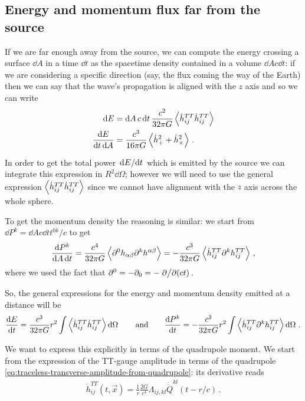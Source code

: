 \documentclass[main.tex]{subfiles}
\begin{document}
\subsection{Energy and momentum flux far from the source}

If we are far enough away from the source, we can compute the energy crossing a surface \(\dd{A}\) in a time \(\dd{t}\) as the spacetime density contained in a volume \(\dd{A} c \dd{t}\): if we are considering a specific direction (say, the flux coming the way of the Earth) then we can say that the wave's propagation is aligned with the \(z\) axis and so we can write 
%
\begin{align}
\dd{E} &= \dd{A} c \dd{t} \frac{c^2}{32 \pi G} \expval{\dot{h}^{TT}_{ij}\dot{h}^{TT}_{ij}} \\
\frac{ \dd{E}}{ \dd{t} \dd{A}} &= \frac{c^3}{16 \pi G} \expval{\dot{h}^2_{+} + \dot{h}^2_{ \times }}
\,.
\end{align}

In order to get the total power \(\dv*{E}{t}\) which is emitted by the source we can integrate this expression in \(R^2 \dd{\Omega }\); however we will need to use the general expression \(\expval{\dot{h}^{TT}_{ij}\dot{h}^{TT}_{ij}}\) since we cannot have alignment with the \(z\) axis across the whole sphere. 

To get the momentum density the reasoning is similar: we start from \(\dd{P^{k}} = \dd{A} c \dd{t} t^{0k}/c\) to get 
%
\begin{align}
\frac{ \dd{P^{k}}}{ \dd{A} \dd{t}} = \frac{c^{4}}{32 \pi G} \expval{ \partial^{0} h_{\alpha \beta } \partial^{ k} h^{\alpha \beta }} 
= - \frac{c^3}{32 \pi G} \expval{\dot{h}^{TT}_{ij} \partial^{k} h_{ij}^{TT}}
\,,
\end{align}
%
where we used the fact that \(\partial^{0} = -\partial_0  =-  \pdv*{}{(ct)}\). 

So, the general expressions for the energy and momentum density emitted at a distance will be 
%
\begin{align}
\dv{E}{t} = \frac{c^3}{32 \pi G} r^2 \int 
\expval{\dot{h}^{TT}_{ij}\dot{h}^{TT}_{ij}} \dd{\Omega }
\qquad \text{and} \qquad
\dv{P^{k}}{t} = - \frac{c^3}{32 \pi G} r^2 
\int \expval{\dot{h}^{TT}_{ij} \partial^{k} h_{ij}^{TT}} \dd{\Omega }
\,.
\end{align}

We want to express this explicitly in terms of the quadrupole moment. We start from the expression of the TT-gauge amplitude in terms of the quadrupole \eqref{eq:traceless-transverse-amplitude-from-quadrupole}: its derivative reads 
%
\begin{align}
\dot{h}_{ij}^{TT} (t, \vec{x}) = \frac{1}{r} \frac{2G}{c^{4}} \Lambda_{ij, kl} \dot{\ddot{Q}}^{kl} (t - r/c)
\,.
\end{align}
\end{document}
